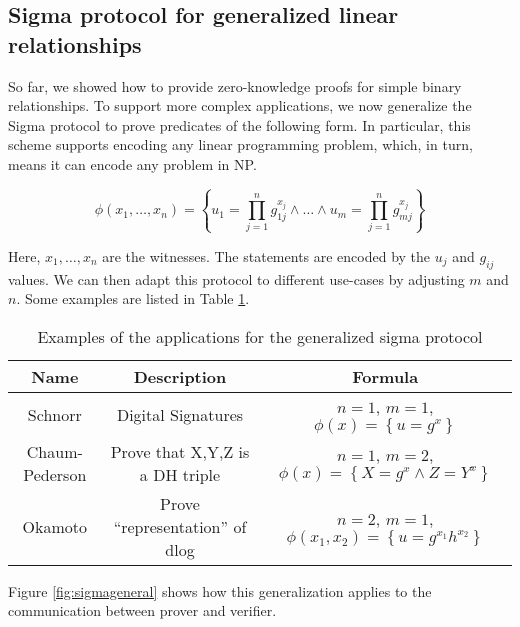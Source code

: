 \subsection{Sigma protocol for generalized linear relationships}

So far, we showed how to provide zero-knowledge proofs for simple binary relationships.
To support more complex applications, we now generalize the Sigma protocol to prove predicates of the following form.
In particular, this scheme supports encoding any linear programming problem, which, in turn, means it can encode any problem in NP.

\begin{equation*}
    \phi(x_1, \dots, x_n) = \left\{ u_1 = \prod_{j=1}^{n} g_{1j}^{x_j} \land \dots \land u_m  = \prod_{j=1}^{n} g_{mj}^{x_j}\right\}
\end{equation*}

Here, $x_1, \dots, x_n$ are the witnesses. The statements are encoded by the $u_j$ and $g_{ij}$ values.
We can then adapt this protocol to different use-cases by adjusting $m$ and $n$. Some examples are listed in Table \ref{tab:sigmaexamples}.

\begin{table}[h]
\begin{tabular}{|c|c|c|}
\hline
    \textbf{Name} & \textbf{Description} & \textbf{Formula} \\
\hline
    Schnorr        & Digital Signatures & $n=1$, $m=1$, $\phi(x) = \left\{ u = g^x \right\}$ \\
    Chaum-Pederson & Prove that X,Y,Z is a DH triple &  $n=1$, $m=2$, $\phi(x) = \left\{ X = g^x \land Z = Y^x\right\}$ \\
    Okamoto        & Prove ``representation'' of dlog &  $n=2$, $m=1$, $\phi(x_1, x_2) = \left\{ u = g^{x_1} h^{x_2} \right\} $ \\
\hline
\end{tabular}

\caption{Examples of the applications for the generalized sigma protocol}
\label{tab:sigmaexamples}
\end{table}

Figure \ref{fig:sigmageneral} shows how this generalization applies to the communication between prover and verifier.


